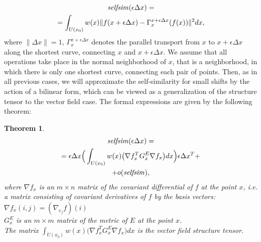 \documentclass[a4paper,twoside]{article}
\newtheorem{theorem}{Theorem}
\newcommand{\selfsim}{\mathop{\it selfsim}}
\newcommand{\delx}{\Delta x}
\begin{document}
\begin{multline*}\selfsim(\epsilon\delx) = \\
= \int_{U(x_0)} w(x) \|f(x+\epsilon\delx) - \Gamma_x^{x+\epsilon\delx}(f(x))\|^2 dx,
\end{multline*}
where $\|\delx\| = 1$, $\Gamma_x^{x+\epsilon\delx}$ denotes the parallel transport from $x$ to $x+\epsilon\delx$ along the shortest curve, connecting $x$ and $x+\epsilon\delx$. We assume that all operations take place in the normal neighborhood of $x$, that is a neighborhood, in which there is only one shortest curve, connecting each pair of points. Then, as in all previous cases, we will approximate the self-similarity for small shifts by the action of a bilinear form, which can be viewed as a generalization of the structure tensor to the vector field case. The formal expressions are given by the following theorem:
\begin{theorem}
\label{VectorFieldCase}
\begin{multline*}\selfsim(\epsilon\delx) = \\
=\epsilon\delx\Big(\int_{U(x_0)} w(x) \big(\nabla f_x^T G^E_{x} \nabla f_x\big) dx\Big) \epsilon\delx^T + \\
+ o(\selfsim),\end{multline*}
where $\nabla f_x$ is an $m \times n$ matrix of the covariant differential of $f$ at the point $x$, i.e. a matrix consisting of covariant derivatives of $f$ by the basis vectors: $\nabla f_x (i, j) = (\nabla_{e_j} f) (i)$
\\
$G^E_x$ is an $m \times m$ matrix of the metric of $E$ at the point $x$.
\\
The matrix $\int_{U(x_0)} w(x) \big(\nabla f_x^T G^E_{x} \nabla f_x\big) dx$ is the vector field structure tensor.
\end{theorem}
\end{document}
